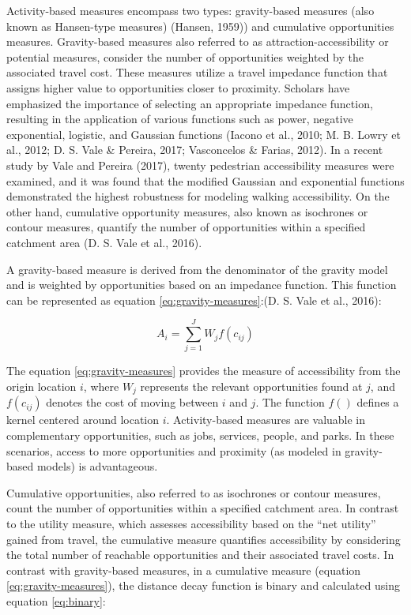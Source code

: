 \documentclass[
11pt, %
oneside, %
english, %
singlespacing, %
]{macthesis} %
\begin{document}
Activity-based measures encompass two types: gravity-based measures (also known as Hansen-type measures) (Hansen, 1959)) and cumulative opportunities measures. Gravity-based measures also referred to as attraction-accessibility or potential measures, consider the number of opportunities weighted by the associated travel cost. These measures utilize a travel impedance function that assigns higher value to opportunities closer to proximity. Scholars have emphasized the importance of selecting an appropriate impedance function, resulting in the application of various functions such as power, negative exponential, logistic, and Gaussian functions (Iacono et al., 2010; M. B. Lowry et al., 2012; D. S. Vale \& Pereira, 2017; Vasconcelos \& Farias, 2012). In a recent study by Vale and Pereira (2017), twenty pedestrian accessibility measures were examined, and it was found that the modified Gaussian and exponential functions demonstrated the highest robustness for modeling walking accessibility. On the other hand, cumulative opportunity measures, also known as isochrones or contour measures, quantify the number of opportunities within a specified catchment area (D. S. Vale et al., 2016).

A gravity-based measure is derived from the denominator of the gravity model and is weighted by opportunities based on an impedance function. This function can be represented as equation \eqref{eq:gravity-measures}:(D. S. Vale et al., 2016):

\begin{equation}
A_i = \sum_{j = 1}^{J} W_{j} f(c_{ij})
\label{eq:gravity-measures}
\end{equation}

The equation \eqref{eq:gravity-measures} provides the measure of accessibility from the origin location \(i\), where \(W_j\) represents the relevant opportunities found at \(j\), and \(f(c_{ij})\) denotes the cost of moving between \(i\) and \(j\). The function \(f()\) defines a kernel centered around location \(i\). Activity-based measures are valuable in complementary opportunities, such as jobs, services, people, and parks. In these scenarios, access to more opportunities and proximity (as modeled in gravity-based models) is advantageous.

Cumulative opportunities, also referred to as isochrones or contour measures, count the number of opportunities within a specified catchment area. In contrast to the utility measure, which assesses accessibility based on the ``net utility'' gained from travel, the cumulative measure quantifies accessibility by considering the total number of reachable opportunities and their associated travel costs. In contrast with gravity-based measures, in a cumulative measure (equation \eqref{eq:gravity-measures}), the distance decay function is binary and calculated using equation \eqref{eq:binary}:
\end{document}
